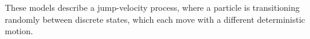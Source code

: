 
These models describe a jump-velocity process, where a particle is
transitioning randomly between discrete states, which each move with a
different deterministic motion.


